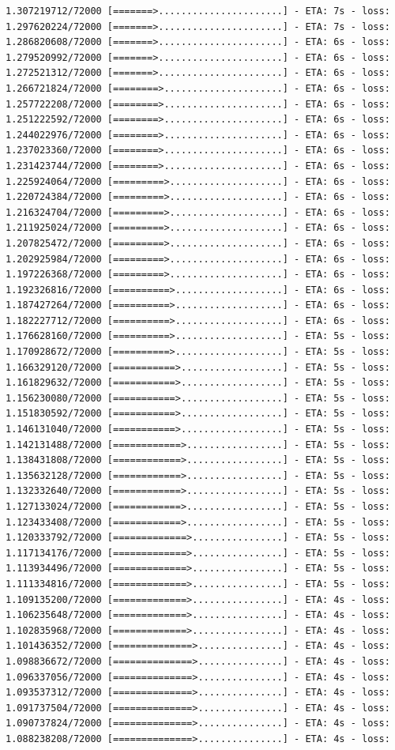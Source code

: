 \documentclass[12pt,fleqn]{article}\usepackage{../../common}
\begin{document}
\begin{verbatim}
1.307219712/72000 [=======>......................] - ETA: 7s - loss: 1.297620224/72000 [=======>......................] - ETA: 7s - loss: 1.286820608/72000 [=======>......................] - ETA: 6s - loss: 1.279520992/72000 [=======>......................] - ETA: 6s - loss: 1.272521312/72000 [=======>......................] - ETA: 6s - loss: 1.266721824/72000 [========>.....................] - ETA: 6s - loss: 1.257722208/72000 [========>.....................] - ETA: 6s - loss: 1.251222592/72000 [========>.....................] - ETA: 6s - loss: 1.244022976/72000 [========>.....................] - ETA: 6s - loss: 1.237023360/72000 [========>.....................] - ETA: 6s - loss: 1.231423744/72000 [========>.....................] - ETA: 6s - loss: 1.225924064/72000 [=========>....................] - ETA: 6s - loss: 1.220724384/72000 [=========>....................] - ETA: 6s - loss: 1.216324704/72000 [=========>....................] - ETA: 6s - loss: 1.211925024/72000 [=========>....................] - ETA: 6s - loss: 1.207825472/72000 [=========>....................] - ETA: 6s - loss: 1.202925984/72000 [=========>....................] - ETA: 6s - loss: 1.197226368/72000 [=========>....................] - ETA: 6s - loss: 1.192326816/72000 [==========>...................] - ETA: 6s - loss: 1.187427264/72000 [==========>...................] - ETA: 6s - loss: 1.182227712/72000 [==========>...................] - ETA: 6s - loss: 1.176628160/72000 [==========>...................] - ETA: 5s - loss: 1.170928672/72000 [==========>...................] - ETA: 5s - loss: 1.166329120/72000 [===========>..................] - ETA: 5s - loss: 1.161829632/72000 [===========>..................] - ETA: 5s - loss: 1.156230080/72000 [===========>..................] - ETA: 5s - loss: 1.151830592/72000 [===========>..................] - ETA: 5s - loss: 1.146131040/72000 [===========>..................] - ETA: 5s - loss: 1.142131488/72000 [============>.................] - ETA: 5s - loss: 1.138431808/72000 [============>.................] - ETA: 5s - loss: 1.135632128/72000 [============>.................] - ETA: 5s - loss: 1.132332640/72000 [============>.................] - ETA: 5s - loss: 1.127133024/72000 [============>.................] - ETA: 5s - loss: 1.123433408/72000 [============>.................] - ETA: 5s - loss: 1.120333792/72000 [=============>................] - ETA: 5s - loss: 1.117134176/72000 [=============>................] - ETA: 5s - loss: 1.113934496/72000 [=============>................] - ETA: 5s - loss: 1.111334816/72000 [=============>................] - ETA: 5s - loss: 1.109135200/72000 [=============>................] - ETA: 4s - loss: 1.106235648/72000 [=============>................] - ETA: 4s - loss: 1.102835968/72000 [=============>................] - ETA: 4s - loss: 1.101436352/72000 [==============>...............] - ETA: 4s - loss: 1.098836672/72000 [==============>...............] - ETA: 4s - loss: 1.096337056/72000 [==============>...............] - ETA: 4s - loss: 1.093537312/72000 [==============>...............] - ETA: 4s - loss: 1.091737504/72000 [==============>...............] - ETA: 4s - loss: 1.090737824/72000 [==============>...............] - ETA: 4s - loss: 1.088238208/72000 [==============>...............] - ETA: 4s - loss: 
\end{verbatim}
\end{document}
